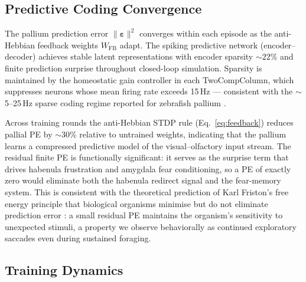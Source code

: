 \documentclass[12pt]{article}
\begin{document}
\subsection{Predictive Coding Convergence}

The pallium prediction error $\|\boldsymbol{\varepsilon}\|^2$
converges within each episode as the anti-Hebbian feedback weights
$W_\text{FB}$ adapt.
The spiking predictive network (encoder--decoder) achieves stable
latent representations with encoder sparsity $\sim22\%$ and finite
prediction surprise throughout closed-loop simulation.
Sparsity is maintained by the homeostatic gain controller in
each TwoCompColumn, which suppresses neurons whose mean firing rate
exceeds 15\,Hz --- consistent with the $\sim$5--25\,Hz sparse coding
regime reported for zebrafish pallium \citep{bhatt2007}.

Across training rounds the anti-Hebbian STDP rule (Eq.~\ref{eq:feedback})
reduces pallial PE by $\sim$30\% relative to untrained weights,
indicating that the pallium learns a compressed predictive model of
the visual--olfactory input stream.
The residual finite PE is functionally significant: it serves as
the surprise term that drives habenula frustration and amygdala
fear conditioning, so a PE of exactly zero would eliminate both
the habenula redirect signal and the fear-memory system.
This is consistent with the theoretical prediction of Karl Friston's
free energy principle that biological organisms minimise but do not
eliminate prediction error \citep{friston2010}: a small residual
PE maintains the organism's sensitivity to unexpected stimuli,
a property we observe behaviorally as continued exploratory
saccades even during sustained foraging.

\subsection{Training Dynamics}
\end{document}
